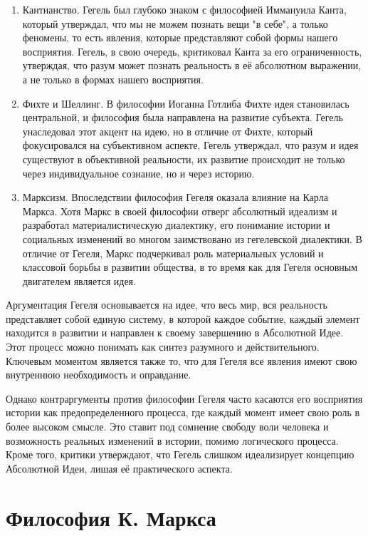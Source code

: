 \documentclass[12pt,a4paper]{article}
\begin{document}
	\begin{enumerate}
		\item Кантианство. Гегель был глубоко знаком с философией Иммануила Канта, который утверждал, что мы не можем познать вещи "в себе", а только феномены, то есть явления, которые представляют собой формы нашего восприятия. Гегель, в свою очередь, критиковал Канта за его ограниченность, утверждая, что разум может познать реальность в её абсолютном выражении, а не только в формах нашего восприятия.
		
		\item Фихте и Шеллинг. В философии Иоганна Готлиба Фихте идея становилась центральной, и философия была направлена на развитие субъекта. Гегель унаследовал этот акцент на идею, но в отличие от Фихте, который фокусировался на субъективном аспекте, Гегель утверждал, что разум и идея существуют в объективной реальности, их развитие происходит не только через индивидуальное сознание, но и через историю.
		
		\item Марксизм. Впоследствии философия Гегеля оказала влияние на Карла Маркса. Хотя Маркс в своей философии отверг абсолютный идеализм и разработал материалистическую диалектику, его понимание истории и социальных изменений во многом заимствовано из гегелевской диалектики. В отличие от Гегеля, Маркс подчеркивал роль материальных условий и классовой борьбы в развитии общества, в то время как для Гегеля основным двигателем является идея.
	\end{enumerate}
	
	Аргументация Гегеля основывается на идее, что весь мир, вся реальность представляет собой единую систему, в которой каждое событие, каждый элемент находится в развитии и направлен к своему завершению в Абсолютной Идее. Этот процесс можно понимать как синтез разумного и действительного. Ключевым моментом является также то, что для Гегеля все явления имеют свою внутреннюю необходимость и оправдание.
	
	Однако контраргументы против философии Гегеля часто касаются его восприятия истории как предопределенного процесса, где каждый момент имеет свою роль в более высоком смысле. Это ставит под сомнение свободу воли человека и возможность реальных изменений в истории, помимо логического процесса. Кроме того, критики утверждают, что Гегель слишком идеализирует концепцию Абсолютной Идеи, лишая её практического аспекта.
	
	\section{Философия К. Маркса}
	
\end{document}
